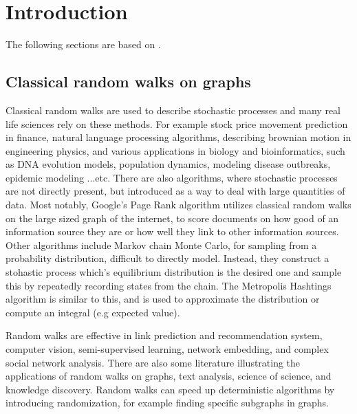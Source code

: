 \chapter{Introduction}


The following sections are based on \cite{XiaReview}.

\section{Classical random walks on graphs}

Classical random walks are used to describe stochastic processes and many real life sciences rely on these methods. For example stock price movement prediction in finance, natural language processing algorithms, describing brownian motion in engineering physics, and various applications in biology and bioinformatics, such as DNA evolution models, population dynamics, modeling disease outbreaks, epidemic modeling ...etc. There are also algorithms, where stochastic processes are not directly present, but introduced as a way to deal with large quantities of data. Most notably, Google's Page Rank algorithm utilizes classical random walks on the large sized graph of the internet, to score documents on how good of an information source they are or how well they link to other information sources. Other algorithms include Markov chain Monte Carlo, for sampling from a probability distribution, difficult to directly model. Instead, they construct a stohastic process which's equilibrium distribution is the desired one and sample this by repeatedly recording states from the chain. The Metropolis Hashtings algorithm is similar to this, and is used to approximate the distribution or compute an integral (e.g expected value).


Random walks are effective in link prediction and recommendation system, computer vision, semi-supervised learning, network embedding, and complex social network analysis. There are also some literature illustrating the applications of random walks on graphs, text analysis, science of science, and knowledge discovery. Random walks can speed up deterministic algorithms by introducing randomization, for example finding specific subgraphs in graphs.

